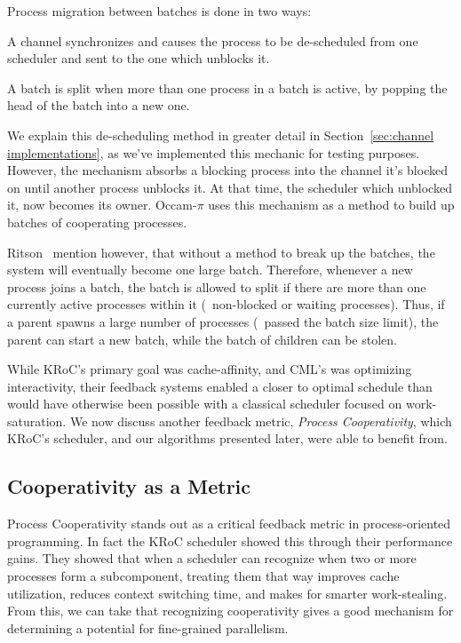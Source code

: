 Process migration between batches is done in two ways: 
\begin{inparaenum}
\item A channel synchronizes and causes the process to be de-scheduled from
one scheduler and sent to the one which unblocks it.
\item A batch is split when more than one process in a batch is active, by 
popping the head of the batch into a new one.
\end{inparaenum}
We explain this de-scheduling method in greater detail in 
Section~\ref{sec:channel implementations}, as we've implemented this mechanic for
testing purposes. However, the mechanism absorbs a blocking process into the 
channel it's blocked on until another process unblocks it. At that time, the
scheduler which unblocked it, now becomes its owner. Occam-$\pi$ uses this 
mechanism as a method to build up batches of cooperating processes.

Ritson \etal~mention however, that without a method to break up the batches, the
system will eventually become one large batch. Therefore, whenever a new process 
joins a batch, the batch is allowed to split if there are more than one currently
active processes within it (\eg~non-blocked or waiting processes). Thus, if a
parent spawns a large number of processes (\ie~passed the batch size limit), the
parent can start a new batch, while the batch of children can be stolen.

While KRoC's primary goal was cache-affinity, and CML's was optimizing 
interactivity, their feedback systems enabled a closer to optimal schedule than
would have otherwise been possible with a classical scheduler focused on 
work-saturation. We now discuss another feedback metric, 
\emph{Process Cooperativity}, 
which KRoC's scheduler, and our algorithms presented later, were able to 
benefit from.

\subsection{Cooperativity as a Metric}

Process Cooperativity stands out as a critical feedback metric in process-oriented
programming. In fact the KRoC scheduler showed this through their performance gains. 
They showed that when a scheduler can recognize when two or more processes form
a subcomponent, treating them that way improves cache utilization, reduces context 
switching time, and makes for smarter work-stealing. 
From this, we can take that recognizing cooperativity gives a good mechanism for
determining a potential for fine-grained parallelism. 

